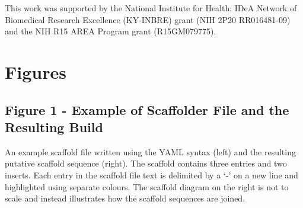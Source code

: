 \documentclass[10pt]{bmc_article}
\newenvironment{bmcformat}{\begin{raggedright}\baselineskip20pt\sloppy\setboolean{publ}{false}}{\end{raggedright}\baselineskip20pt\sloppy}
\begin{document}
\begin{bmcformat}
This work was supported by the National Institute for Health: IDeA Network of
Biomedical Research Excellence (KY-INBRE) grant (NIH 2P20 RR016481-09) and the
NIH R15 AREA Program grant (R15GM079775).

\clearpage

{
   }     %


\clearpage

\section*{Figures} %

\subsection*{Figure 1 - Example of Scaffolder File and the Resulting Build}

An example scaffold file written using the YAML syntax \cite{yaml} (left) and
the resulting putative scaffold sequence (right). The scaffold contains three
entries and two inserts. Each entry in the scaffold file text is delimited by
a `-' on a new line and highlighted using separate colours. The scaffold
diagram on the right is not to scale and instead illustrates how the scaffold
sequences are joined. \pb

\end{bmcformat}
\end{document}
